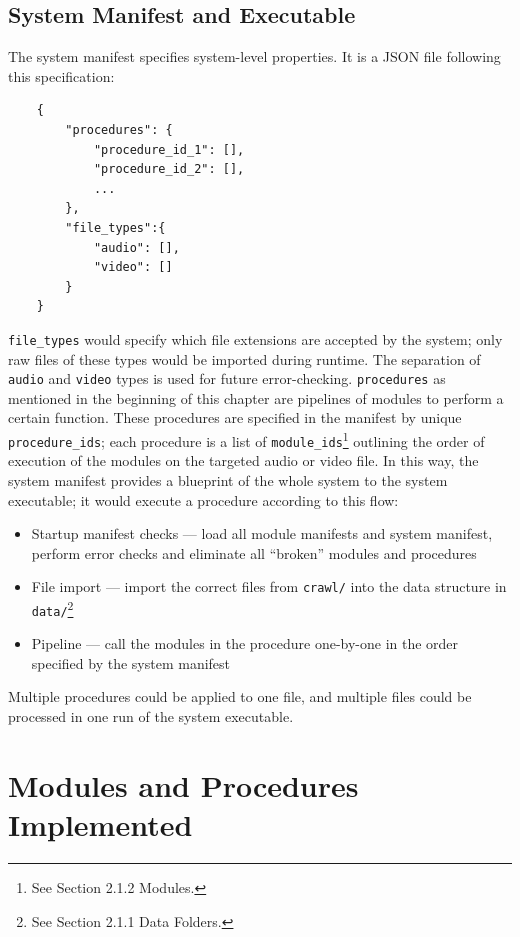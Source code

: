\subsection{System Manifest and Executable}

The system manifest specifies system-level properties. It is a JSON file following this specification:

\begin{lstlisting}
    {
        "procedures": {
            "procedure_id_1": [],
            "procedure_id_2": [],
            ...
        },
        "file_types":{
            "audio": [],
            "video": []
        }
    }
\end{lstlisting}

\texttt{file\_types} would specify which file extensions are accepted by the system; only raw files of these types would be imported during runtime. The separation of \texttt{audio} and \texttt{video} types is used for future error-checking. \texttt{procedures} as mentioned in the beginning of this chapter are pipelines of modules to perform a certain function. These procedures are specified in the manifest by unique \texttt{procedure\_ids}; each procedure is a list of \texttt{module\_ids}\footnote{See Section 2.1.2 Modules.} outlining the order of execution of the modules on the targeted audio or video file. In this way, the system manifest provides a blueprint of the whole system to the system executable; it would execute a procedure according to this flow:

\begin{itemize}
    \item Startup manifest checks --- load all module manifests and system manifest, perform error checks and eliminate all ``broken'' modules and procedures
    \item File import --- import the correct files from \texttt{crawl/} into the data structure in \texttt{data/}\footnote{See Section 2.1.1 Data Folders.}
    \item Pipeline --- call the modules in the procedure one-by-one in the order specified by the system manifest
\end{itemize}

Multiple procedures could be applied to one file, and multiple files could be processed in one run of the system executable.

\section{Modules and Procedures Implemented}

